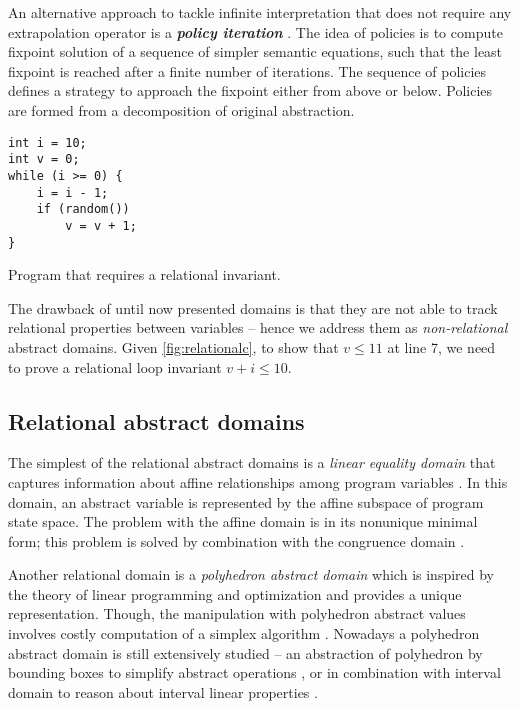 An alternative approach to tackle infinite interpretation that does not require
any extrapolation operator is a \textbf{\emph{policy iteration}}
\cite{Costan2005, Gaubert2007, Gawlitza2007, Gawlitza2007b, Gawlitza2011}. The
idea of policies is to compute fixpoint solution of a sequence of simpler
semantic equations, such that the least fixpoint is reached after a finite
number of iterations.  The sequence of policies defines a strategy to approach
the fixpoint either from above or below. Policies are formed from a
decomposition of original abstraction.

\begin{marginfigure}
\begin{verbatim}
int i = 10;
int v = 0;
while (i >= 0) {
    i = i - 1;
    if (random())
        v = v + 1;
}
\end{verbatim}
    \caption{Program that requires a relational invariant.}
    \label{fig:relationalc}
\end{marginfigure}

The drawback of until now presented domains is that they are not able to track
relational properties between variables -- hence we address them as
\emph{non-relational} abstract domains. Given \autoref{fig:relationalc}, to
show that $v \leq 11$ at line 7, we need to prove a relational loop invariant
$v + i \leq 10$.


\subsection{Relational abstract domains}

The simplest of the relational abstract domains is a \emph{linear equality
domain} that captures information about affine relationships among program
variables \cite{Karr1976}. In this domain, an abstract variable is represented
by the affine subspace of program state space. The problem with the affine
domain is in its nonunique minimal form; this problem is solved by combination
with the congruence domain \cite{Granger1991}.

Another relational domain is a \emph{polyhedron abstract domain} which is
inspired by the theory of linear programming and optimization \cite{Cousot1978, Venet2012}
and provides a unique representation. Though, the manipulation with polyhedron
abstract values involves costly computation of a simplex algorithm
\cite{Schrijver1986}. Nowadays a polyhedron abstract domain is still
extensively studied -- an abstraction of polyhedron by bounding boxes to
simplify abstract operations \cite{Singh2017}, or in combination with interval
domain to reason about interval linear properties \cite{Chen2009}.

